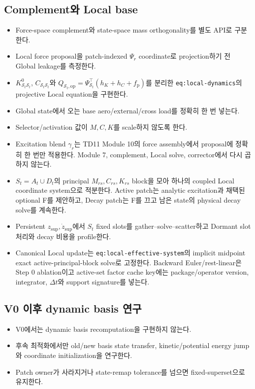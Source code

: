 \documentclass[10pt,a4paper]{article}
\newcommand{\todo}{\textcolor{TodoGray}{\(\square\)}}
\newcommand{\code}[1]{\texttt{#1}}
\begin{document}
\subsection*{Complement와 Local base}

\begin{itemize}
  \item[\todo] Force-space complement와 state-space mass orthogonality를 별도 API로 구분한다.
  \item[\todo] Local force proposal을 patch-indexed \(\Psi_r\) coordinate로 projection하기 전 Global leakage를 측정한다.
  \item[\todo] \(K_{\mathcal S_t\mathcal S_t}^0\),
  \(C_{\mathcal S_t\mathcal S_t}\)와
  \(Q_{\mathcal S_t,\mathrm{op}}=\Psi_{\mathcal S_t}^\top(h_K+h_C+f_{\mathrm p})\)를
  분리한 \code{eq:local-dynamics}의 projective Local equation을 구현한다.
  \item[\todo] Global state에서 오는 base aero/external/cross load를 정확히 한 번 넣는다.
  \item[\todo] Selector/activation 값이 \(M,C,K\)를 scale하지 않도록 한다.
  \item[\todo] Excitation blend \(\gamma_r\)는 TD11 Module 10의 force assembly에서 proposal에 정확히 한 번만 적용한다. Module 7, complement, Local solve, corrector에서 다시 곱하지 않는다.
  \item[\todo] \(S_t=A_t\cup D_t\)의 principal \(M_{rs},C_{rs},K_{rs}\) block을 모아 하나의 coupled Local coordinate system으로 적분한다.
  Active patch는 analytic excitation과 채택된 optional F를 제안하고, Decay patch는 F를 끄고 남은 state의 physical decay solve를 계속한다.
  \item[\todo] Persistent \(z_{\mathrm{sup}},\dot z_{\mathrm{sup}}\)에서 \(S_t\) fixed slots를 gather--solve--scatter하고 Dormant slot 처리와 decay 비용을 profile한다.
  \item[\todo] Canonical Local update는 \code{eq:local-effective-system}의 implicit midpoint exact
  active-principal-block solve로 고정한다. Backward Euler/rest-linear은 Step 0 ablation이고
  active-set factor cache key에는 package/operator version, integrator, \(\Delta t\)와 support signature를 넣는다.
\end{itemize}

\subsection*{V0 이후 dynamic basis 연구}

\begin{itemize}
  \item V0에서는 dynamic basis recomputation을 구현하지 않는다.
  \item 후속 최적화에서만 old/new basis state transfer, kinetic/potential energy jump와 coordinate initialization을 연구한다.
  \item Patch owner가 사라지거나 state-remap tolerance를 넘으면 fixed-superset으로 유지한다.
\end{itemize}
\end{document}
